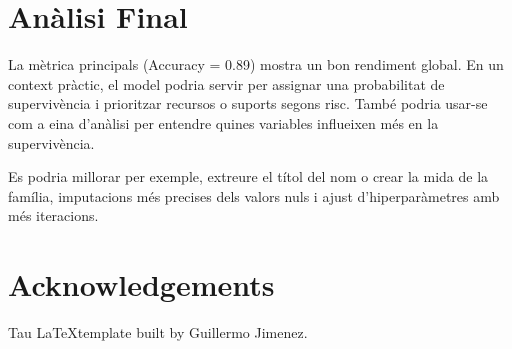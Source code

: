 \documentclass[9pt,a4paper,twoside]{tau-class/tau}
\begin{document}
\section{Anàlisi Final}
La mètrica principals (Accuracy = 0.89) mostra un bon rendiment global. En un context pràctic, el model podria servir per assignar una probabilitat de supervivència i prioritzar recursos o suports segons risc. També podria usar-se com a eina d’anàlisi per entendre quines variables influeixen més en la supervivència.

Es podria millorar per exemple, extreure el títol del nom o crear la mida de la família, imputacions més precises dels valors nuls i ajust d'hiperparàmetres amb més iteracions.

\section{Acknowledgements}

Tau \LaTeX template built by Guillermo Jimenez.


\printbibliography

\end{document}
